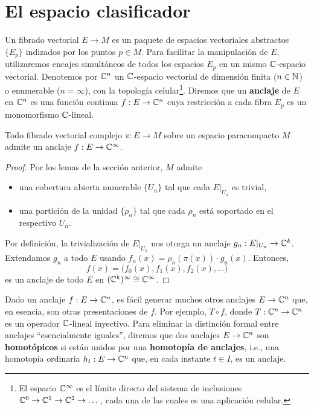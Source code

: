 \section{El espacio clasificador}

Un fibrado vectorial $E \to M$ es un paquete de espacios vectoriales abstractos $\{ E_p \}$ indizados por los puntos $p \in M$. Para facilitar la manipulación de $E$, utilizaremos encajes simultáneos de todos los espacios $E_p$ en un mismo $\mathbb C$-espacio vectorial. Denotemos por $\mathbb C^n$ un $\mathbb C$-espacio vectorial de dimensión finita ($n \in \mathbb N$) o enumerable ($n = \infty$), con la topología celular\footnote{El espacio $\mathbb C^\infty$ es el límite directo del sistema de inclusiones $\mathbb C^0 \to \mathbb C^1 \to \mathbb C^2 \to \dots$, cada una de las cuales es una aplicación celular.}. Diremos que un \textbf{anclaje} de $E$ en $\mathbb C^n$ es una función continua $f : E \to \mathbb C^n$ cuya restricción a cada fibra $E_p$ es un monomorfismo $\mathbb C$-lineal.

\begin{proposition}
Todo fibrado vectorial complejo $\pi : E \to M$ sobre un espacio paracompacto $M$ admite un anclaje $f : E \to \mathbb C^\infty$.
\end{proposition}

\begin{proof}
Por los lemas de la sección anterior, $M$ admite
\begin{itemize}
    \itemsep 0em
    \item una cobertura abierta numerable $\{ U_n \}$ tal que cada $E \vert_{U_n}$ es trivial,
    \item una partición de la unidad $\{ \rho_n \}$ tal que cada $\rho_n$ está soportado en el respectivo $U_n$.
\end{itemize}
Por definición, la trivialización de $E \vert_{U_n}$ nos otorga un anclaje $g_n : E \vert_{U_n} \to \mathbb C^k$. Extendamos $g_n$ a todo $E$ usando $f_n(x) = \rho_n(\pi(x)) \cdot g_n(x)$. Entonces,
$$f(x) = \Big( f_0(x), f_1(x), f_2(x), \dots \Big)$$
es un anclaje de todo $E$ en $(\mathbb C^k)^\infty \cong \mathbb C^\infty$.
\end{proof}

Dado un anclaje $f : E \to \mathbb C^n$, es fácil generar muchos otros anclajes $E \to \mathbb C^n$ que, en esencia, son otras presentaciones de $f$. Por ejemplo, $T \circ f$, donde $T : \mathbb C^n \to \mathbb C^n$ es un operador $\mathbb C$-lineal inyectivo. Para eliminar la distinción formal entre anclajes ``esencialmente iguales'', diremos que dos anclajes $E \to \mathbb C^n$ son \textbf{homotópicos} si están unidos por una \textbf{homotopía de anclajes}, i.e., una homotopía ordinaria $h_t : E \to \mathbb C^n$ que, en cada instante $t \in I$, es un anclaje.

